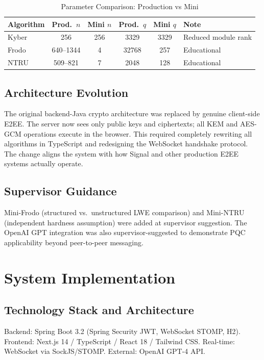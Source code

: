 \documentclass[11pt,a4paper]{article}
\begin{document}
\begin{table}[H]
\centering\small
\caption{Parameter Comparison: Production vs Mini}
\label{tab:params}
\begin{tabular}{l|c|c|c|c|l}
\toprule
\textbf{Algorithm} & \textbf{Prod.\ $n$} & \textbf{Mini $n$} & \textbf{Prod.\ $q$} & \textbf{Mini $q$} & \textbf{Note} \\
\midrule
Kyber & 256 & 256 & 3329 & 3329 & Reduced module rank \\
Frodo & 640--1344 & 4 & 32768 & 257 & Educational \\
NTRU & 509--821 & 7 & 2048 & 128 & Educational \\
\bottomrule
\end{tabular}
\end{table}

\subsection{Architecture Evolution}

The original backend-Java crypto architecture was replaced by genuine client-side E2EE. The server now sees only public keys and ciphertexts; all KEM and AES-GCM operations execute in the browser. This required completely rewriting all algorithms in TypeScript and redesigning the WebSocket handshake protocol. The change aligns the system with how Signal and other production E2EE systems actually operate.

\subsection{Supervisor Guidance}

Mini-Frodo (structured vs.\ unstructured LWE comparison) and Mini-NTRU (independent hardness assumption) were added at supervisor suggestion. The OpenAI GPT integration was also supervisor-suggested to demonstrate PQC applicability beyond peer-to-peer messaging.

\section{System Implementation}

\subsection{Technology Stack and Architecture}

Backend: Spring Boot 3.2 (Spring Security JWT, WebSocket STOMP, H2). Frontend: Next.js 14 / TypeScript / React 18 / Tailwind CSS. Real-time: WebSocket via SockJS/STOMP. External: OpenAI GPT-4 API.
\end{document}
